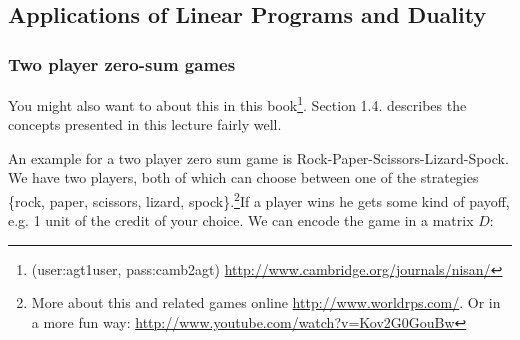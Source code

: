 \subsection{Applications of Linear Programs and Duality}
\subsubsection{Two player zero-sum games}

You might also want to about this in this book\footnote{(user:agt1user, pass:camb2agt) \url{http://www.cambridge.org/journals/nisan/}}. Section 1.4. describes the concepts presented in this lecture fairly well.

An example for a two player zero sum game is Rock-Paper-Scissors-Lizard-Spock. We have two players, both of which can choose between one of the strategies \{rock, paper, scissors, lizard, spock\}.\footnote{More about this and related games online \url{http://www.worldrps.com/}. Or in a more fun way: \url{http://www.youtube.com/watch?v=Kov2G0GouBw}}If a player wins he gets some kind of payoff, e.g. 1 unit of the credit of your choice. We can encode the game in a matrix $D$:


